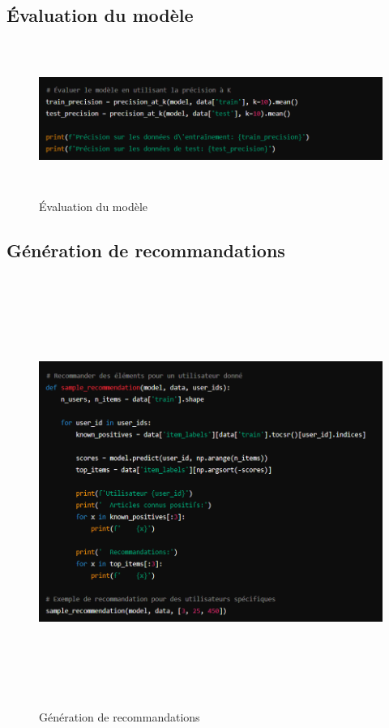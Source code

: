 \documentclass[edit,12pt,a4paper,ChapStyle,oneside,doubleinterligne]{report}
\begin{document}
\subsection{Évaluation du modèle}
\begin{figure} [H]
    \centering
    \includegraphics[width=15.742708333cm , height = 5cm , angle=360]{images/Évaluation du modèle.png}
    \caption{Évaluation du modèle}
    \label{fig:Évaluation du modèle}
\end{figure}
\subsection{Génération de recommandations}
\begin{figure} [H]
    \centering
    \includegraphics[width=15.742708333cm , height = 14cm , angle=360]{images/Génération de recommandations.png}
    \caption{Génération de recommandations}
    \label{fig:Génération de recommandations}
\end{figure}
\end{document}
